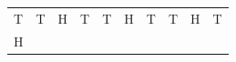 {{\begin{center}
\begin{tabular}[t]{|l|l|l|l|l|l|l|l|l|l|}
     \tabularnewline\cline{1-1}\cline{2-2}\cline{3-3}\cline{4-4}\cline{5-5}\cline{6-6}\cline{7-7}\cline{8-8}\cline{9-9}\cline{10-10}
        T &
        T &
        H &
        T &
        T &
        H &
        T &
        T &
        H &
        T%
     \tabularnewline\cline{1-1}\cline{2-2}\cline{3-3}\cline{4-4}\cline{5-5}\cline{6-6}\cline{7-7}\cline{8-8}\cline{9-9}\cline{10-10}
        H &

\end{tabular}
\end{center}}}
